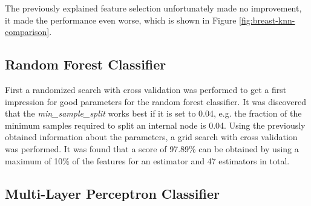 
The previously explained feature selection unfortunately made no improvement, it made the performance even worse, which is shown in Figure \ref{fig:breast-knn-comparison}.


\subsection{Random Forest Classifier}

First a randomized search with cross validation was performed to get a first impression for good parameters for the random forest classifier.
It was discovered that the \textit{min\_sample\_split} works best if it is set to 0.04, e.g. the fraction of the minimum samples required to split an internal node is 0.04.
Using the previously obtained information about the parameters, a grid search with cross validation was performed.
It was found that a score of 97.89\% can be obtained by using a maximum of 10\% of the features for an estimator and 47 estimators in total.


\subsection{Multi-Layer Perceptron Classifier}

